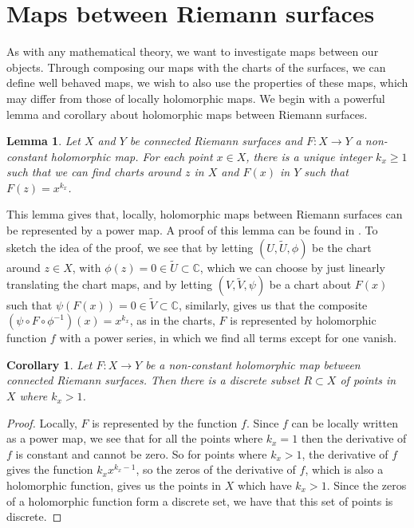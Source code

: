 \documentclass[11pt]{report}
\newtheorem{lemma}[thm]{Lemma}
\newtheorem{cor}[thm]{Corollary}
\theoremstyle{definition}
\newenvironment{sproof}{%
  \renewcommand{\proofname}{Sketch Proof}\proof}{\endproof}
\begin{document}
\section{Maps between Riemann surfaces}
As with any mathematical theory, we want to investigate maps between our objects. Through composing our maps with the charts of the surfaces, we can define well behaved maps, we wish to also use the properties of these maps, which may differ from those of locally holomorphic maps.
We begin with a powerful lemma and corollary about holomorphic maps between Riemann surfaces.
\begin{lemma}
  Let $X$ and $Y$ be connected Riemann surfaces and $F:X \rightarrow Y$ a non-constant holomorphic map. For each point $x \in X$, there is a unique integer $k_x \geq 1$ such that we can find charts around $z$ in $X$ and $F(x)$ in $Y$ such that $F(z) = x^{k_x}$.
\end{lemma}
\begin{sproof}
  This lemma gives that, locally, holomorphic maps between Riemann surfaces can be represented by a power map. A proof of this lemma can be found in \cite[(p.43, Proposition 5)]{donaldson}. To sketch the idea of the proof, we see that by letting $(U,\tilde{U},\phi)$ be the chart around $z \in X$, with $\phi(z)=0\in \tilde{U} \subset \mathbb{C}$, which we can choose by just linearly translating the chart maps, and by letting $(V,\tilde{V},\psi)$ be a chart about $F(x)$ such that $\psi(F(x)) = 0 \in \tilde{V} \subset \mathbb{C}$, similarly, gives us that the composite $(\psi \circ F \circ \phi^{-1})(x)=x^{k_x}$, as in the charts, $F$ is represented by holomorphic function $f$ with a power series, in which we find all terms except for one vanish.
\end{sproof}
\begin{cor}
  Let $F:X \rightarrow Y$ be a non-constant holomorphic map between connected Riemann surfaces. Then there is a discrete subset $R \subset X$ of points in $X$ where $k_x > 1$.
\end{cor}
\begin{proof}
  Locally, $F$ is represented by the function $f$. Since $f$ can be locally written as a power map, we see that for all the points where $k_x = 1$ then the derivative of $f$ is constant and cannot be zero. So for points where $k_x > 1$, the derivative of $f$ gives the function $k_xx^{k_x-1}$, so the zeros of the derivative of $f$, which is also a holomorphic function, gives us the points in $X$ which have $k_x > 1$. Since the zeros of a holomorphic function form a discrete set, we have that this set of points is discrete.
\end{proof}
\end{document}
